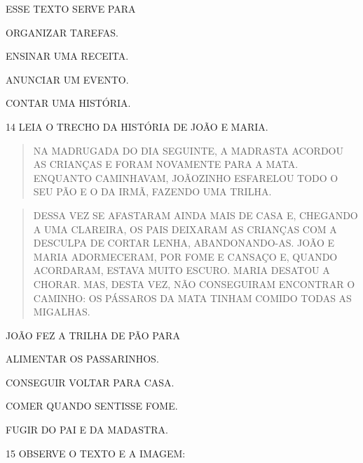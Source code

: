 ESSE TEXTO SERVE PARA

\begin{escolha}
\item ORGANIZAR TAREFAS.

\item ENSINAR UMA RECEITA.

\item ANUNCIAR UM EVENTO.

\item CONTAR UMA HISTÓRIA.
\end{escolha}

\num{14} LEIA O TRECHO DA HISTÓRIA DE JOÃO E MARIA.

\begin{quote}
NA MADRUGADA DO DIA SEGUINTE, A MADRASTA ACORDOU AS CRIANÇAS E FORAM
NOVAMENTE PARA A MATA. ENQUANTO CAMINHAVAM, JOÃOZINHO ESFARELOU TODO O
SEU PÃO E O DA IRMÃ, FAZENDO UMA TRILHA.
\end{quote}

\begin{quote}
DESSA VEZ SE AFASTARAM AINDA
MAIS DE CASA E, CHEGANDO A UMA CLAREIRA, OS PAIS DEIXARAM AS CRIANÇAS
COM A DESCULPA DE CORTAR LENHA, ABANDONANDO-AS. JOÃO E MARIA
ADORMECERAM, POR FOME E CANSAÇO E, QUANDO ACORDARAM, ESTAVA MUITO
ESCURO. MARIA DESATOU A CHORAR. MAS, DESTA VEZ, NÃO CONSEGUIRAM
ENCONTRAR O CAMINHO: OS PÁSSAROS DA MATA TINHAM COMIDO TODAS AS
MIGALHAS.

\end{quote}

JOÃO FEZ A TRILHA DE PÃO PARA

\begin{escolha}
\item ALIMENTAR OS PASSARINHOS.

\item CONSEGUIR VOLTAR PARA CASA.

\item COMER QUANDO SENTISSE FOME.

\item FUGIR DO PAI E DA MADASTRA.
\end{escolha}

\num{15} OBSERVE O TEXTO E A IMAGEM:


